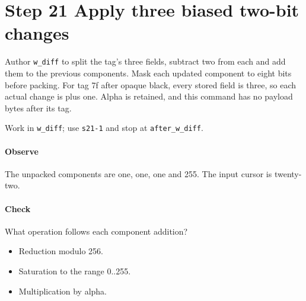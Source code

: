 \section{Step 21 Apply three biased two-bit changes}\label{qoi-s21}
Author \texttt{w\_diff} to split the tag’s three fields, subtract two from each and add them to the previous components. Mask each updated component to eight bits before packing. For tag 7f after opaque black, every stored field is three, so each actual change is plus one. Alpha is retained, and this command has no payload bytes after its tag.

Work in \texttt{w\_diff}; use \texttt{s21-1} and stop at \texttt{after\_w\_diff}.

\paragraph{Observe} The unpacked components are one, one, one and 255. The input cursor is twenty-two.

\paragraph{Check} What operation follows each component addition?
\begin{itemize}
  \item[A.] Reduction modulo 256.
  \item[B.] Saturation to the range 0..255.
  \item[C.] Multiplication by alpha.
\end{itemize}
